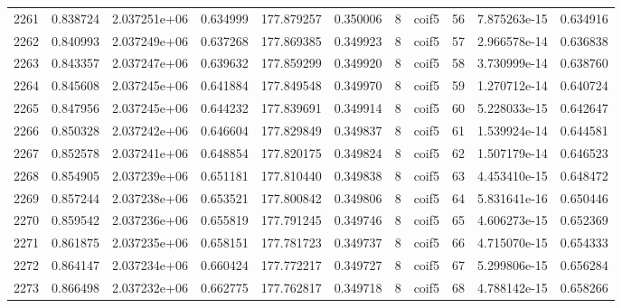 \begin{tabular}{lrrrrrrlrrr}
2261 &    0.838724 &        2.037251e+06 &  0.634999 &              177.879257 &    0.350006 &       8 &        coif5 &     56 &   7.875263e-15 &      0.634916 \\
2262 &    0.840993 &        2.037249e+06 &  0.637268 &              177.869385 &    0.349923 &       8 &        coif5 &     57 &   2.966578e-14 &      0.636838 \\
2263 &    0.843357 &        2.037247e+06 &  0.639632 &              177.859299 &    0.349920 &       8 &        coif5 &     58 &   3.730999e-14 &      0.638760 \\
2264 &    0.845608 &        2.037245e+06 &  0.641884 &              177.849548 &    0.349970 &       8 &        coif5 &     59 &   1.270712e-14 &      0.640724 \\
2265 &    0.847956 &        2.037245e+06 &  0.644232 &              177.839691 &    0.349914 &       8 &        coif5 &     60 &   5.228033e-15 &      0.642647 \\
2266 &    0.850328 &        2.037242e+06 &  0.646604 &              177.829849 &    0.349837 &       8 &        coif5 &     61 &   1.539924e-14 &      0.644581 \\
2267 &    0.852578 &        2.037241e+06 &  0.648854 &              177.820175 &    0.349824 &       8 &        coif5 &     62 &   1.507179e-14 &      0.646523 \\
2268 &    0.854905 &        2.037239e+06 &  0.651181 &              177.810440 &    0.349838 &       8 &        coif5 &     63 &   4.453410e-15 &      0.648472 \\
2269 &    0.857244 &        2.037238e+06 &  0.653521 &              177.800842 &    0.349806 &       8 &        coif5 &     64 &   5.831641e-16 &      0.650446 \\
2270 &    0.859542 &        2.037236e+06 &  0.655819 &              177.791245 &    0.349746 &       8 &        coif5 &     65 &   4.606273e-15 &      0.652369 \\
2271 &    0.861875 &        2.037235e+06 &  0.658151 &              177.781723 &    0.349737 &       8 &        coif5 &     66 &   4.715070e-15 &      0.654333 \\
2272 &    0.864147 &        2.037234e+06 &  0.660424 &              177.772217 &    0.349727 &       8 &        coif5 &     67 &   5.299806e-15 &      0.656284 \\
2273 &    0.866498 &        2.037232e+06 &  0.662775 &              177.762817 &    0.349718 &       8 &        coif5 &     68 &   4.788142e-15 &      0.658266 \\

\end{tabular}
